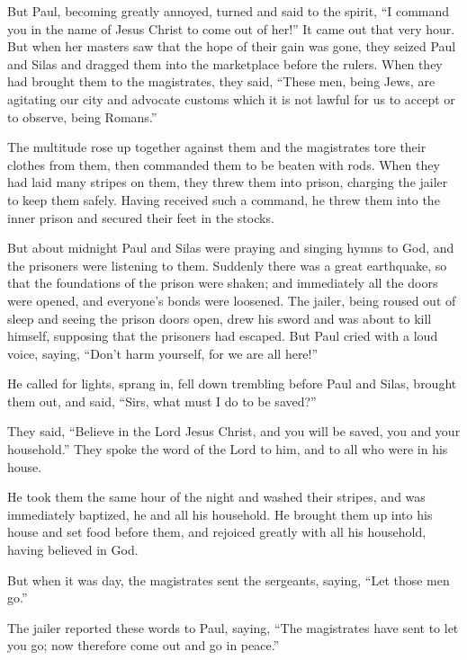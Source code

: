But Paul, becoming greatly annoyed, turned and said to the spirit, ``I
command you in the name of Jesus Christ to come out of her!'' It came
out that very hour.  But when her masters saw that the hope
of their gain was gone, they seized Paul and Silas and dragged them into
the marketplace before the rulers.  When they had brought
them to the magistrates, they said, ``These men, being Jews, are
agitating our city  and advocate customs which it is not
lawful for us to accept or to observe, being Romans.''

 The multitude rose up together against them and the
magistrates tore their clothes from them, then commanded them to be
beaten with rods.  When they had laid many stripes on them,
they threw them into prison, charging the jailer to keep them safely.
 Having received such a command, he threw them into the
inner prison and secured their feet in the stocks.

 But about midnight Paul and Silas were praying and singing
hymns to God, and the prisoners were listening to them. 
Suddenly there was a great earthquake, so that the foundations of the
prison were shaken; and immediately all the doors were opened, and
everyone's bonds were loosened.  The jailer, being roused
out of sleep and seeing the prison doors open, drew his sword and was
about to kill himself, supposing that the prisoners had escaped.
 But Paul cried with a loud voice, saying, ``Don't harm
yourself, for we are all here!''

 He called for lights, sprang in, fell down trembling
before Paul and Silas,  brought them out, and said, ``Sirs,
what must I do to be saved?''

 They said, ``Believe in the Lord Jesus Christ, and you
will be saved, you and your household.''  They spoke the
word of the Lord to him, and to all who were in his house.

 He took them the same hour of the night and washed their
stripes, and was immediately baptized, he and all his household.
 He brought them up into his house and set food before
them, and rejoiced greatly with all his household, having believed in
God.

 But when it was day, the magistrates sent the sergeants,
saying, ``Let those men go.''

 The jailer reported these words to Paul, saying, ``The
magistrates have sent to let you go; now therefore come out and go in
peace.''

